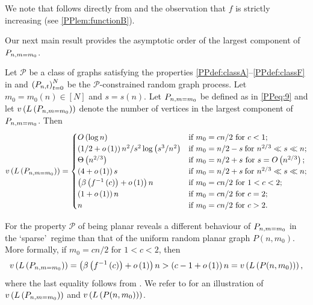 We note that  follows directly from  and the observation that $f$ is strictly increasing (see \ref{PPlem:functionB}).

Our next main result provides the asymptotic order of the largest component of $P_{n,m=m_0}$.

\begin{thm}\label{PPthm:largestComponent}
	Let $\mathcal{P}$ be a class of graphs satisfying the properties \ref{PPdef:classA}--\ref{PPdef:classF} in  and $\left(P_{n,t}\right)_{t=0}^{N}$ be the $\mathcal{P}$-constrained random graph process. Let $m_0=m_0(n)\in\left[N\right]$ and $s=s(n)$. Let $P_{n,m=m_0}$ be defined as in \eqref{PPeq:9} and let $v\left({L\left(P_{n,m=m_0}\right)}\right)$ denote the number of vertices in the largest component of $P_{n,m=m_0}$. Then \whp
	\begin{align*}
		v\left({L\left(P_{n,m=m_0}\right)}\right)=
		\begin{cases}
			O\left(\log n\right) & \text{if} ~ m_0=cn/2 ~\text{for}~ c<1;
			\\
			\left(1/2+o\left(1\right)\right)n^2/s^2\log\left(s^3/n^2\right) & \text{if} ~ m_0=n/2-s \hspace{0.09cm}\text{for}~ n^{2/3}\ll s\ll n;
			\\
			\Theta\left(n^{2/3}\right)& \text{if} ~ m_0=n/2+s ~\text{for}~ s=O\left(n^{2/3}\right);
			\\
			\left(4+o\left(1\right)\right)s& \text{if} ~ m_0=n/2+s \hspace{0.09cm}\text{for}~ n^{2/3}\ll s\ll n;
			\\
			\left(\beta\left(f^{-1}\left(c\right)\right)+o\left(1\right)\right)n& \text{if} ~ m_0=cn/2 ~\text{for}~ 1<c<2;
			\\
			\left(1+o\left(1\right)\right)n& \text{if} ~ m_0=cn/2 ~\text{for}~ c=2;
			\\
			n& \text{if} ~ m_0=cn/2 ~\text{for}~ c>2.
		\end{cases}
	\end{align*}
\end{thm}

For the property $\mathcal{P}$ of being planar  reveals a different behaviour of $P_{n,m=m_0}$ in the \lq sparse\rq\ regime than that of the uniform random planar graph $P(n,m_0)$. More formally, if $m_0=cn/2$ for $1<c<2$, then \whp
\begin{align}\label{PPeq:11}
v\left({L\left(P_{n,m=m_0}\right)}\right)=\left(\beta\left(f^{-1}\left(c\right)\right)+o\left(1\right)\right)n>\left(c-1+o\left(1\right)\right)n=v\left({L\left(P(n,m_0)\right)}\right),
\end{align}
where the last equality follows from \cite{KangLuczak2012}. We refer to  for an illustration of $v\left({L\left(P_{n,m=m_0}\right)}\right)$ and $v\left({L\left(P(n,m_0)\right)}\right)$.




